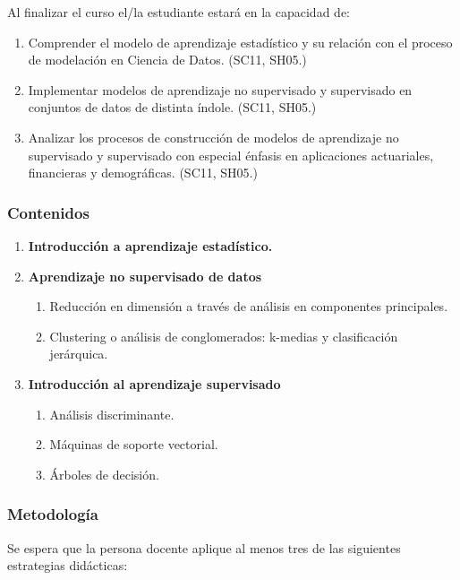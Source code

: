 \begin{refsection}
Al finalizar el curso el/la estudiante estará en la capacidad de:

\begin{enumerate}
\item Comprender el modelo de aprendizaje estadístico y su relación con el proceso de modelación en Ciencia de Datos. (SC11, SH05.)
\item Implementar modelos de aprendizaje no supervisado y supervisado en conjuntos de datos de distinta índole. (SC11, SH05.)
\item Analizar los procesos de construcción de modelos de aprendizaje no supervisado y supervisado con especial énfasis en aplicaciones actuariales, financieras y demográficas. (SC11, SH05.)
\end{enumerate}

\subsubsection*{Contenidos}

\begin{enumerate}
\item \textbf{Introducción a aprendizaje estadístico.}
\item \textbf{Aprendizaje no supervisado de datos}
\begin{enumerate}
\item Reducción en dimensión a través de análisis en componentes principales.
\item Clustering o análisis de conglomerados: k-medias y clasificación jerárquica.
\end{enumerate}
\item \textbf{Introducción al aprendizaje supervisado}
\begin{enumerate}
\item Análisis discriminante.
\item Máquinas de soporte vectorial.
\item Árboles de decisión.
\end{enumerate}
\end{enumerate}

\subsubsection*{Metodología}

Se espera que la persona docente aplique al menos tres de las siguientes estrategias didácticas:


\end{refsection}
